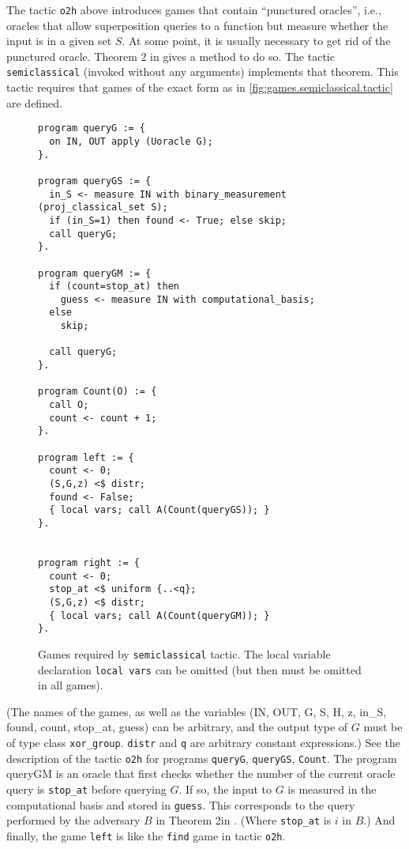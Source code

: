 \documentclass{article}
\begin{document}
The tactic \texttt{o2h} above introduces games that contain
``punctured oracles'', i.e., oracles that allow superposition queries
to a function but measure whether the input is in a given set $S$. At
some point, it is usually necessary to get rid of the punctured
oracle. Theorem 2 in \cite{ambainis19semiclassical} gives a method to do so. The
tactic \texttt{semiclassical} (invoked without any arguments) implements that theorem.
This tactic requires that games of the exact
form as in \autoref{fig:games.semiclassical.tactic} are
defined.
%
\begin{figure}[t]
  {\smaller\smaller  \lstset{language=qrhl}
\begin{lstlisting}
program queryG := {
  on IN, OUT apply (Uoracle G);
}.

program queryGS := {
  in_S <- measure IN with binary_measurement (proj_classical_set S);
  if (in_S=1) then found <- True; else skip;
  call queryG;
}.

program queryGM := {
  if (count=stop_at) then
    guess <- measure IN with computational_basis;
  else
    skip;

  call queryG;
}.

program Count(O) := {
  call O;
  count <- count + 1;
}.

program left := {
  count <- 0;
  (S,G,z) <$ distr;
  found <- False;
  { local vars; call A(Count(queryGS)); }
}.


program right := {
  count <- 0;
  stop_at <$ uniform {..<q};
  (S,G,z) <$ distr;
  { local vars; call A(Count(queryGM)); }
}.
\end{lstlisting}
  }
  \caption[Games required by semiclassical tactic.]{\label{fig:games.semiclassical.tactic}Games required by \texttt{semiclassical} tactic.
      The local variable declaration \texttt{local vars} can be omitted (but then must be omitted in all games).}
\end{figure}
%
(The names of the games, as well as the variables (IN,
OUT, G, S, H, z, in\_S, found, count, stop\_at, guess) can be
arbitrary, and the output type of $G$ must be of type class
\texttt{xor\_group}. \texttt{distr} and \texttt{q} are arbitrary
constant expressions.)  See the description of the tactic \texttt{o2h}
for programs \texttt{queryG}, \texttt{queryGS}, \texttt{Count}.  The
program \textrm{queryGM} is an oracle that first checks
whether the number of the current oracle query is \texttt{stop\_at}
before querying $G$.  If so, the input to $G$ is measured in the
computational basis and stored in \texttt{guess}.  This corresponds to
the query performed by the adversary $B$ in
Theorem 2in \cite{ambainis19semiclassical}. (Where \texttt{stop\_at} is $i$ in
$B$.)  And finally, the game \texttt{left} is like the \texttt{find}
game in tactic \texttt{o2h}.
\end{document}

